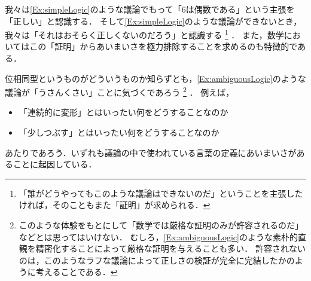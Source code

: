 
我々は\cref{Ex:simpleLogic}のような議論でもって「6は偶数である」という主張を「正しい」と認識する．
そして\cref{Ex:simpleLogic}のような議論ができないとき，我々は「それはおそらく正しくないのだろう」と認識する%
\footnote{%
	「誰がどうやってもこのような議論はできないのだ」ということを主張したければ，そのこともまた「証明」が求められる．
}%
．
また，数学においてはこの「証明」からあいまいさを極力排除することを求めるのも特徴的である．


位相同型というものがどういうものか知らずとも，\cref{Ex:ambiguousLogic}のような議論が「うさんくさい」ことに気づくであろう%
\footnote{%
	このような体験をもとにして「数学では厳格な証明のみが許容されるのだ」などとは思ってはいけない．
	むしろ，\cref{Ex:ambiguousLogic}のような素朴的直観を精密化することによって厳格な証明を与えることも多い．
	許容されないのは，このようなラフな議論によって正しさの検証が完全に完結したかのように考えることである．
}%
．
例えば，
\begin{itemize}
	\item 「連続的に変形」とはいったい何をどうすることなのか
	\item 「少しつぶす」とはいったい何をどうすることなのか
\end{itemize}
あたりであろう．いずれも議論の中で使われている言葉の定義にあいまいさがあることに起因している．

